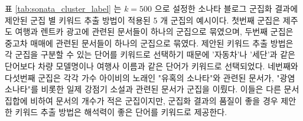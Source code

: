 \documentclass[oneside, ko,phd]{snuthesis_utf8_kor}
\begin{document}
표 \ref{tab:sonata_cluster_label} 는 $k=500$ 으로 설정한 소나타 블로그 군집화 결과에 제안된 군집 별 키워드 추출 방법이 적용된 5 개 군집의 예시이다.
첫번째 군집은 제주도 여행과 렌트카 광고에 관련된 문서들이 하나의 군집으로 묶였으며, 두번째 군집은 중고차 매매에 관련된 문서들이 하나의 군집으로 묶였다.
제안된 키워드 추출 방법은 각 군집을 구분할 수 있는 단어를 키워드로 선택하기 때문에 '자동차'나 '세단'과 같은 단어보다 차량 모델명이나 여행사 이름과 같은 단어가 키워드로 선택되었다.
네번째와 다섯번째 군집은 각각 가수 아이비의 노래인 "유혹의 소나타"와 관련된 문서가, "광염 소나타"를 비롯한 일제 강점기 소설과 관련된 문서가 군집을 이뤘다.
이들은 다른 문서 집합에 비하여 문서의 개수가 적은 군집이지만, 군집화 결과의 품질이 좋을 경우 제안한 키워드 추출 방법은 해석력이 좋은 단어를 키워드로 제공한다.

\begin{table}[H]
\centering
\caption{소나타 블로그의 k=500 문서 군집화 결과}
\label{tab:sonata_cluster_label}
\end{table}
\end{document}
